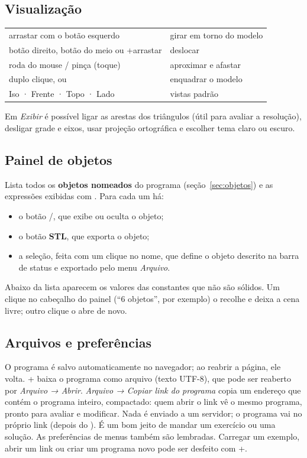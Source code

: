 \subsection{Visualização}
\begin{longtable}{@{}L{0.45}L{0.55}@{}}
\toprule
arrastar com o botão esquerdo & girar em torno do modelo \\
botão direito, botão do meio ou +arrastar & deslocar \\
roda do mouse / pinça (toque) & aproximar e afastar \\
duplo clique,  ou  & enquadrar o modelo \\
Iso · Frente · Topo · Lado & vistas padrão \\
\bottomrule
\end{longtable}
Em \emph{Exibir} é possível ligar as arestas dos triângulos (útil para avaliar a resolução), desligar grade
e eixos, usar projeção ortográfica e escolher tema claro ou escuro.

\subsection{Painel de objetos}
Lista todos os \textbf{objetos nomeados} do programa (seção~\ref{sec:objetos}) e as expressões exibidas com .
Para cada um há:
\begin{itemize}
  \item o botão /, que exibe ou oculta o objeto;
  \item o botão \textbf{STL}, que exporta o objeto;
  \item a seleção, feita com um clique no nome, que define o objeto descrito na barra de status e exportado pelo menu \emph{Arquivo}.
\end{itemize}
Abaixo da lista aparecem os valores das constantes que não são sólidos. Um clique no cabeçalho do painel
(“6 objetos”, por exemplo) o recolhe e deixa a cena livre; outro clique o abre de novo.

\subsection{Arquivos e preferências}
O programa é salvo automaticamente no navegador; ao reabrir a página, ele volta. + baixa o
programa como arquivo  (texto UTF-8), que pode ser reaberto por \emph{Arquivo → Abrir}.
\emph{Arquivo → Copiar link do programa} copia um endereço que contém o programa inteiro, compactado:
quem abrir o link vê o mesmo programa, pronto para avaliar e modificar. Nada é enviado a um servidor; o
programa vai no próprio link (depois do \code{\#}). É um bom jeito de mandar um exercício ou uma solução.
As preferências de menus também são lembradas. Carregar um exemplo, abrir um link ou criar um programa novo pode ser desfeito com +.

